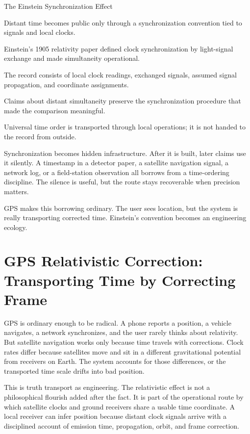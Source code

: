 \begin{phenom}{The Einstein Synchronization Effect~\cite{einstein1905}}
\label{ph:einstein-synchronization}

\PhStatement
Distant time becomes public only through a synchronization convention tied to
signals and local clocks.

\PhOrigin
Einstein's 1905 relativity paper defined clock synchronization by light-signal
exchange and made simultaneity operational.

\PhObservation
The record consists of local clock readings, exchanged signals, assumed signal
propagation, and coordinate assignments.

\PhConstraint
Claims about distant simultaneity preserve the synchronization procedure
that made the comparison meaningful.

\PhConsequence
Universal time order is transported through local operations; it is not handed
to the record from outside.
\end{phenom}

Synchronization becomes hidden infrastructure. After it is built, later
claims use it silently. A timestamp in a detector paper, a satellite
navigation signal, a network log, or a field-station observation all
borrows from a time-ordering discipline. The silence is useful, but the
route stays recoverable when precision matters.

GPS makes this borrowing ordinary. The user sees location, but the system
is really transporting corrected time. Einstein's convention becomes an
engineering ecology.

\section{GPS Relativistic Correction: Transporting Time by Correcting Frame}

GPS is ordinary enough to be radical. A phone reports a position, a
vehicle navigates, a network synchronizes, and the user rarely thinks
about relativity. But satellite navigation works only because time
travels with corrections. Clock rates differ because satellites move and
sit in a different gravitational potential from receivers on Earth. The
system accounts for those differences, or the transported time scale
drifts into bad position.

This is truth transport as engineering. The relativistic effect is not a
philosophical flourish added after the fact. It is part of the
operational route by which satellite clocks and ground receivers share a
usable time coordinate. A local receiver can infer position because
distant clock signals arrive with a disciplined account of emission
time, propagation, orbit, and frame correction.

